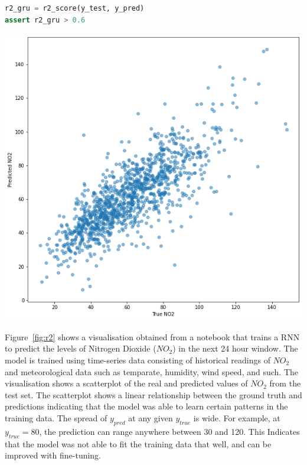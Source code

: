 \documentclass[conference]{IEEEtran}
\begin{document}
\begin{minipage}{0.45\textwidth}
  \begin{lstlisting}[language=Python]
r2_gru = r2_score(y_test, y_pred)
assert r2_gru > 0.6
  \end{lstlisting}
  \label{lst:r2}
\end{minipage}
\hfill
\begin{minipage}{0.45\textwidth}
  \includegraphics[width=\linewidth]{../catalogue/select-332a.png}
  \label{fig:r2}
\end{minipage}

Figure~\ref{fig:r2} shows a visualisation obtained from a notebook that trains a RNN to predict the levels of Nitrogen Dioxide ($NO_2$) in the next 24 hour window. The model is trained using time-series data consisting of historical readings of $NO_2$ and meteorological data such as temparate, humidity, wind speed, and such. The visualisation shows a scatterplot of the real and predicted values of $NO_2$ from the test set. The scatterplot shows a linear relationship between the ground truth and predictions indicating that the model was able to learn certain patterns in the training data. The spread of $y_{pred}$ at any given $y_{true}$ is wide. For example, at $y_{true} = 80$, the prediction can range anywhere between 30 and 120. This Indicates that the model was not able to fit the training data that well, and can be improved with fine-tuning.
\end{document}
